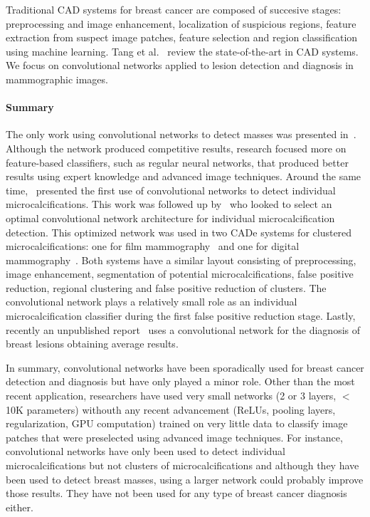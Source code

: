 Traditional CAD systems for breast cancer are composed of succesive stages: preprocessing and image enhancement, localization of suspicious regions, feature extraction from suspect image patches, feature selection and region classification using machine learning.
Tang et al.~\cite{Tang2009} review the state-of-the-art in CAD systems. We focus on convolutional networks applied to lesion detection and diagnosis in mammographic images.

\paragraph{Summary}
The only work using convolutional networks to detect masses was presented in~\cite{Sahiner1996}. Although the network produced competitive results, research focused more on feature-based classifiers, such as regular neural networks, that produced better results using expert knowledge and advanced image techniques. Around the same time,~\cite{Lo1995} presented the first use of convolutional networks to detect individual microcalcifications. This work was followed up by~\cite{Gurcan2002} who looked to select an optimal convolutional network architecture for individual microcalcification detection. This optimized network was used in two CADe systems for clustered microcalcifications: one for film mammography~\cite{Gurcan2002} and one for digital mammography~\cite{Ge2006}. Both systems have a similar layout consisting of preprocessing, image enhancement, segmentation of potential microcalcifications, false positive reduction, regional clustering and false positive reduction of clusters. The convolutional network plays a relatively small role as an individual microcalcification classifier during the first false positive reduction stage. Lastly, recently an unpublished report~\cite{Agarwal2015} uses a convolutional network for the diagnosis of breast lesions obtaining average results.

In summary, convolutional networks have been sporadically used for breast cancer detection and diagnosis but have only played a minor role. Other than the most recent application, researchers have used very small networks (2 or 3 layers, $<$10K parameters) withouth any recent advancement (ReLUs, pooling layers, regularization, GPU computation) trained on very little data to classify image patches that were preselected using advanced image techniques. For instance, convolutional networks have only been used to detect individual microcalcifications but not clusters of microcalcifications and although they have been used to detect breast masses, using a larger network could probably improve those results. They have not been used for any type of breast cancer diagnosis either.

